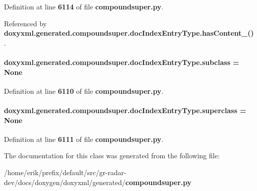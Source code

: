 Definition at line {\bf 6114} of file {\bf compoundsuper.\+py}.



Referenced by {\bf doxyxml.\+generated.\+compoundsuper.\+doc\+Index\+Entry\+Type.\+has\+Content\+\_\+()}.

\paragraph[{subclass}]{\setlength{\rightskip}{0pt plus 5cm}doxyxml.\+generated.\+compoundsuper.\+doc\+Index\+Entry\+Type.\+subclass = None\hspace{0.3cm}{\ttfamily [static]}}\label{classdoxyxml_1_1generated_1_1compoundsuper_1_1docIndexEntryType_ae5c9df81e3c993616b7961fd8c482b17}


Definition at line {\bf 6110} of file {\bf compoundsuper.\+py}.

\paragraph[{superclass}]{\setlength{\rightskip}{0pt plus 5cm}doxyxml.\+generated.\+compoundsuper.\+doc\+Index\+Entry\+Type.\+superclass = None\hspace{0.3cm}{\ttfamily [static]}}\label{classdoxyxml_1_1generated_1_1compoundsuper_1_1docIndexEntryType_ae00992d7ccaeedb58a970bb3ba5febf2}


Definition at line {\bf 6111} of file {\bf compoundsuper.\+py}.



The documentation for this class was generated from the following file\+:\begin{DoxyCompactItemize}
\item 
/home/erik/prefix/default/src/gr-\/radar-\/dev/docs/doxygen/doxyxml/generated/{\bf compoundsuper.\+py}\end{DoxyCompactItemize}
